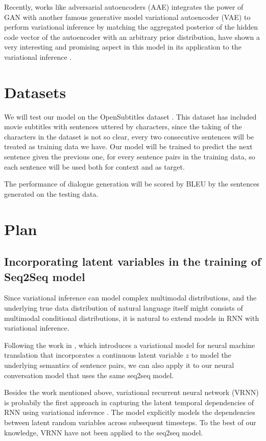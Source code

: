 \documentclass{article}
\begin{document}
Recently, works like adversarial autoencoders (AAE) \cite{aae} integrates the power of GAN with another famous generative model variational autoencoder (VAE) to perform variational inference by matching the aggregated posterior of the hidden code vector of the autoencoder with an arbitrary prior distribution, have shown a very interesting and promising aspect in this model in its application to the variational inference .

\section{Datasets}

We will test our model on the OpenSubtitles dataset \cite{opensubtitle}. This dataset has included movie subtitles with sentences uttered by characters, since the taking of the characters in the dataset is not so clear, every two consecutive sentences will be treated as training data we have. Our model will be trained to predict the next sentence given the  previous one, for every sentence pairs in the training data, so each sentence  will be used both for context and as target.

The performance of dialogue generation will be scored by BLEU by the sentences generated on the testing data. 
 

\section{Plan}

\subsection{Incorporating latent variables in the training of Seq2Seq model}
Since variational inference can model complex multimodal distributions, and the underlying true data distribution of natural language itself might consists of multimodal conditional distributions, it is natural to extend models in RNN with variational inference.

Following the work in \cite{vnmt}, which introduces a variational model for neural machine translation that incorporates a continuous latent variable $z$ to model the underlying semantics of sentence pairs, we can also apply it to our neural conversation model that uses the same seq2seq model. 

Besides the work mentioned above, variational recurrent neural network (VRNN) is probabily the first approach in capturing the latent temporal dependencies of RNN using variational inference \cite{vrnn}. The model explicitly models the dependencies between latent random variables across subsequent timesteps. To the best of our knowledge, VRNN have not been applied to the seq2seq model.
\end{document}
